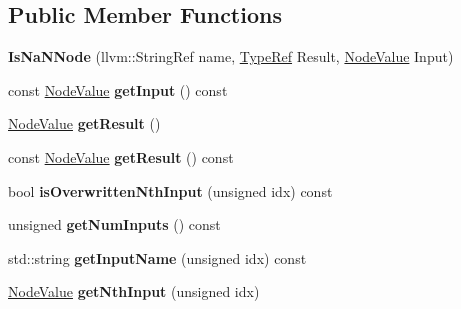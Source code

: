 \subsection*{Public Member Functions}
\begin{DoxyCompactItemize}
\item 
\mbox{\label{classglow_1_1_is_na_n_node_a00ea507198f2b8441beadbdbf3a99a6e}} 
{\bfseries Is\+Na\+N\+Node} (llvm\+::\+String\+Ref name, \hyperlink{structglow_1_1_type}{Type\+Ref} Result, \hyperlink{structglow_1_1_node_value}{Node\+Value} Input)
\item 
\mbox{\label{classglow_1_1_is_na_n_node_af8e601e7cab23ee8e1d4c2f18083676f}} 
const \hyperlink{structglow_1_1_node_value}{Node\+Value} {\bfseries get\+Input} () const
\item 
\mbox{\label{classglow_1_1_is_na_n_node_a98560a3af85f48b7c2b335960cfcfdbf}} 
\hyperlink{structglow_1_1_node_value}{Node\+Value} {\bfseries get\+Result} ()
\item 
\mbox{\label{classglow_1_1_is_na_n_node_a956871f68aef7f4ecc71d1af9a872b09}} 
const \hyperlink{structglow_1_1_node_value}{Node\+Value} {\bfseries get\+Result} () const
\item 
\mbox{\label{classglow_1_1_is_na_n_node_abf88d6afc6c97240d6b36d286887479e}} 
bool {\bfseries is\+Overwritten\+Nth\+Input} (unsigned idx) const
\item 
\mbox{\label{classglow_1_1_is_na_n_node_ae58baf6fc22f1532bcf2f46cea81ad58}} 
unsigned {\bfseries get\+Num\+Inputs} () const
\item 
\mbox{\label{classglow_1_1_is_na_n_node_aac23d838914389a33b8778a973119b28}} 
std\+::string {\bfseries get\+Input\+Name} (unsigned idx) const
\item 
\mbox{\label{classglow_1_1_is_na_n_node_a1b8fa9ae8c67df2a2caf9fc243bbad04}} 
\hyperlink{structglow_1_1_node_value}{Node\+Value} {\bfseries get\+Nth\+Input} (unsigned idx)
\item 
\mbox{\label{classglow_1_1_is_na_n_node_a27bab3db30e157ea7769483ddcd7eb88}} 

\end{DoxyCompactItemize}
